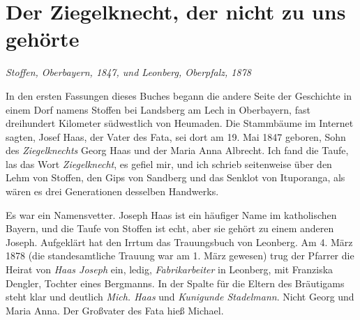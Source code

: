 \documentclass[
  ngerman,
  11pt,
  openany]{book}
\begin{document}
\section{Der Ziegelknecht, der nicht zu uns
gehörte}\label{der-ziegelknecht-der-nicht-zu-uns-gehuxf6rte}

\emph{Stoffen, Oberbayern, 1847, und Leonberg, Oberpfalz, 1878}

In den ersten Fassungen dieses Buches begann die andere Seite der
Geschichte in einem Dorf namens Stoffen bei Landsberg am Lech in
Oberbayern, fast dreihundert Kilometer südwestlich von Heumaden. Die
Stammbäume im Internet sagten, Josef Haas, der Vater des Fata, sei dort
am 19. Mai 1847 geboren, Sohn des \emph{Ziegelknechts} Georg Haas und
der Maria Anna Albrecht. Ich fand die Taufe, las das Wort
\emph{Ziegelknecht}, es gefiel mir, und ich schrieb seitenweise über den
Lehm von Stoffen, den Gips von Sandberg und das Senklot von Ituporanga,
als wären es drei Generationen desselben Handwerks.

Es war ein Namensvetter. Joseph Haas ist ein häufiger Name im
katholischen Bayern, und die Taufe von Stoffen ist echt, aber sie gehört
zu einem anderen Joseph. Aufgeklärt hat den Irrtum das Trauungsbuch von
Leonberg. Am 4. März 1878 (die standesamtliche Trauung war am 1. März
gewesen) trug der Pfarrer die Heirat von \emph{Haas Joseph} ein, ledig,
\emph{Fabrikarbeiter} in Leonberg, mit Franziska Dengler, Tochter eines
Bergmanns. In der Spalte für die Eltern des Bräutigams steht klar und
deutlich \emph{Mich. Haas} und \emph{Kunigunde Stadelmann}. Nicht Georg
und Maria Anna. Der Großvater des Fata hieß Michael.
\end{document}
